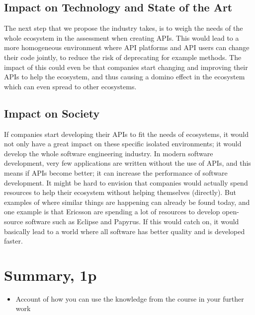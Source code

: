 \documentclass{article}
\begin{document}
\subsection{Impact on Technology and State of the Art}
The next step that we propose the industry takes, is to weigh the needs of the whole ecosystem in the assessment when creating APIs. This would lead to a more homogeneous environment where API platforms and API users can change their code jointly, to reduce the risk of deprecating for example methods. The impact of this could even be that companies start changing and improving their APIs to help the ecosystem, and thus causing a domino effect in the ecosystem which can even spread to other ecosystems. 

\subsection{Impact on Society}
If companies start developing their APIs to fit the needs of ecosystems, it would not only have a great impact on these specific isolated environments; it would develop the whole software engineering industry. In modern software development, very few applications are written without the use of APIs, and this means if APIs become better; it can increase the performance of software development. It might be hard to envision that companies would actually spend resources to help their ecosystem without helping themselves (directly). But examples of where similar things are happening can already be found today, and one example is that Ericsson are spending a lot of resources to develop open-source software such as Eclipse and Papyrus. If this would catch on, it would basically lead to a world where all software has better quality and is developed faster. 

\section{Summary, 1p}

\begin{itemize}
	\item Account of how you can use the knowledge from the course in your further work
\end{itemize}




\end{document}
